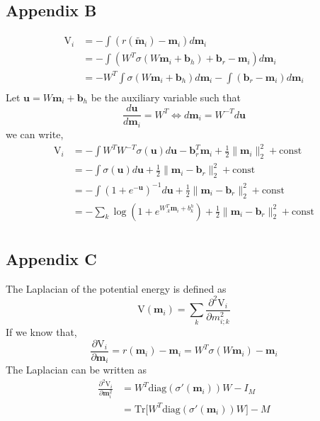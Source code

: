 \documentclass[12pt]{report}
\begin{document}
\subsection*{Appendix B}
\begin{equation}
\begin{split}
\mathrm{V}_i &= -\int (r(\tilde{\textbf{m}}_i) - \textbf{m}_i)d\textbf{m}_i  \\
&= -\int (W^T\sigma(W\textbf{m}_i + \textbf{b}_h)+\textbf{b}_r - \textbf{m}_i)d\textbf{m}_i \\
&= -W^T\int \sigma(W\textbf{m}_i + \textbf{b}_h)d\textbf{m}_i - \int (\textbf{b}_r - \textbf{m}_i)d\textbf{m}_i \\
\end{split}
\end{equation}
Let $\textbf{u} = W\textbf{m}_i + \textbf{b}_h$ be the auxiliary variable such that
\begin{equation}
\frac{d\textbf{u}}{d\textbf{m}_i} = W^T \Leftrightarrow d\textbf{m}_i = W^{-T}d\textbf{u}
\end{equation}
we can write,
\begin{equation}
\begin{split}
\mathrm{V}_i &=-\int W^TW^{-T}\sigma(\textbf{u})d\textbf{u} - \textbf{b}_r^T\textbf{m}_i +\frac{1}{2}\lVert \textbf{m}_i \rVert_2^2 + \text{const} \\
&= -\int \sigma(\textbf{u})d\textbf{u} + \frac{1}{2}\lVert \textbf{m}_i - \textbf{b}_r \rVert_2^2 + \text{const} \\
&= -\int (1+ e^{-\textbf{u}})^{-1}d\textbf{u} + \frac{1}{2}\lVert \textbf{m}_i - \textbf{b}_r \rVert_2^2 + \text{const} \\
&= -\sum_k\log (1+e^{W_{.k}^T\textbf{m}_i + b_k^h}) + \frac{1}{2}\lVert \textbf{m}_i - \textbf{b}_r \rVert_2^2 + \text{const} \\
\end{split}
\end{equation}

\subsection*{Appendix C}
The Laplacian of the potential energy is defined as
\begin{equation}
\mathrm{V}(\textbf{m}_i) = \sum_k \frac{\partial^2\mathrm{V}_i}{\partial m_{i;k}^2}
\end{equation}
If we know that,
\begin{equation}
\frac{\partial\mathrm{V}_i}{\partial \textbf{m}_i} = r(\textbf{m}_i) - \textbf{m}_i = W^T\sigma(W\textbf{m}_i) - \textbf{m}_i
\end{equation}
The Laplacian can be written as
\begin{equation}
\begin{split}
\frac{\partial^2\mathrm{V}_i}{\partial \textbf{m}_i^2} &= W^T\text{diag}(\sigma'(\textbf{m}_i))W - I_M \\
&= \text{Tr}\big[W^T\text{diag}(\sigma'(\textbf{m}_i))W\big] - M
\end{split}
\end{equation}
\end{document}
